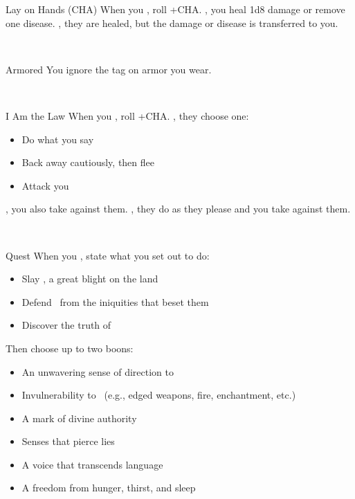 \documentclass[8pt]{extarticle}
\begin{document}
\begin{minipage}[t]{4.6in}



\begin{basicmove}{Lay on Hands (CHA)}
  When you , roll +CHA. \onSuccess, you heal 1d8 damage or remove
  one disease. \onPartial, they are healed, but the damage or disease
  is transferred to you.
\end{basicmove}
\

\begin{basicmove}{Armored}
  You ignore the  tag on armor you wear.
\end{basicmove}
\

\begin{basicmove}{I Am the Law}
  When you , roll +CHA. \onPartial, they choose one:

  \begin{itemize}
  \item Do what you say
  \item Back away cautiously, then flee
  \item Attack you
  \end{itemize}

  \onSuccess, you also take  against them. \onMiss, they
  do as they please and you take  against them.
\end{basicmove}
\

\begin{basicmove}{Quest}
  When you , state what you set out to do:

  \begin{itemize}
  \item Slay \blank, a great blight on the land
  \item Defend \blank\ from the iniquities that beset them
  \item Discover the truth of \blank
  \end{itemize}

  Then choose up to two boons:

  \begin{itemize}
  \item An unwavering sense of direction to \blank
  \item Invulnerability to \blank\ (e.g., edged weapons, fire, enchantment, etc.)
  \item A mark of divine authority
  \item Senses that pierce lies
  \item A voice that transcends language
  \item A freedom from hunger, thirst, and sleep
  \end{itemize}


\end{basicmove}
\end{minipage}
\end{document}
